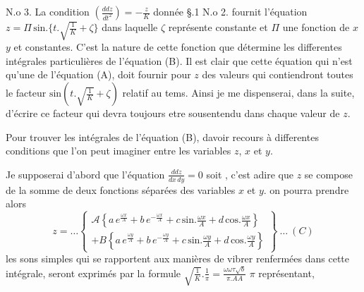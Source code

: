 \documentclass[11pt,a4paper]{article}
\begin{document}
N.o 3. La condition  $\left(\frac{ddz}{dt^2}\right) = -\frac{z}{K}$ donnée §.1 N.o 2. fournit
l'équation $z = \Pi\,\text{sin.}\{t.\sqrt{\tfrac{1}{K}}+\zeta\}$ dans laquelle  $\zeta$
représente   constante et $\Pi$ une fonction de $x$ $y$ et constantes.
C'est la nature de cette fonction que détermine les
differentes intégrales particulières de l'équation  (B). Il est clair que cette équation qui n'est qu'une
  de l'équation (A), doit fournir pour $z$ des
valeurs qui contiendront toutes le facteur $\text{sin}(t.\sqrt{\tfrac{1}{K}}+\zeta)$
relatif au tems. Ainsi je me dispenserai, dans la suite,
d'écrire ce facteur qui devra toujours etre sousentendu
dans chaque valeur de $z$.

Pour trouver les intégrales de l'équation (B),  
davoir recours à differentes conditions que l'on peut imaginer
entre les variables $z$, $x$ et $y$.

Je supposerai d'abord que  l'équation $\frac{ddz}{dx\,dy} = 0$ soit
 , c'est adire que $z$ se compose de la somme
de deux fonctions séparées des variables $x$ et $y$. on pourra
prendre alors
\[ z = \ldots\left\{\begin{array}{l}
\mathcal{A}\left\{a\,e^{\frac{\omega x}{A}}+b\,e^{-\frac{\omega x}{A}}+c\,\text{sin.}\frac{\omega x}{A}+d\,\text{cos.}\frac{\omega x}{A}\right\}\\[1ex]
+B\left\{a\,e^{\frac{\omega y}{A}}+b\,e^{-\frac{\omega y}{A}}+c\,\text{sin.}\frac{\omega y}{A}+d\,\text{cos.}\frac{\omega y}{A}\right\}
\end{array}\right\}\ \ldots\ (C) \]
les sons simples qui se rapportent aux  manières
de vibrer renfermées dans cette intégrale, seront
exprimés par la formule $\sqrt{\tfrac{1}{K}}.\frac{1}{\pi} = \frac{\omega\omega\tau\sqrt{b}}{\pi.AA}$ $\pi$ représentant,
\end{document}
